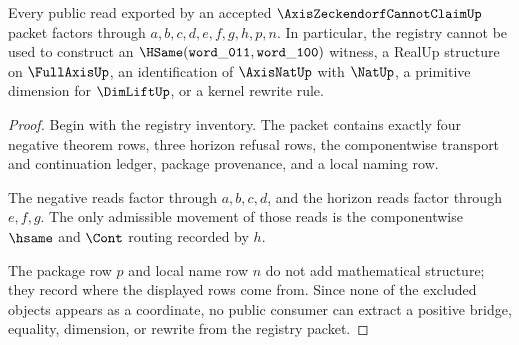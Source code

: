 \begin{theorem}
\label{thm:axis-zeckendorf-cannot-claim-non-escape}
Every public read exported by an accepted $\AxisZeckendorfCannotClaimUp$ packet factors through $a,b,c,d,e,f,g,h,p,n$. In particular, the registry cannot be used to construct an $\HSame(\mathtt{word\_011},\mathtt{word\_100})$ witness, a RealUp structure on $\FullAxisUp$, an identification of $\AxisNatUp$ with $\NatUp$, a primitive dimension for $\DimLiftUp$, or a kernel rewrite rule.
\end{theorem}
\begin{proof}
Begin with the registry inventory. The packet contains exactly four negative theorem rows, three horizon refusal rows, the componentwise transport and continuation ledger, package provenance, and a local naming row.

The negative reads factor through $a,b,c,d$, and the horizon reads factor through $e,f,g$. The only admissible movement of those reads is the componentwise $\hsame$ and $\Cont$ routing recorded by $h$.

The package row $p$ and local name row $n$ do not add mathematical structure; they record where the displayed rows come from. Since none of the excluded objects appears as a coordinate, no public consumer can extract a positive bridge, equality, dimension, or rewrite from the registry packet.
\end{proof}

